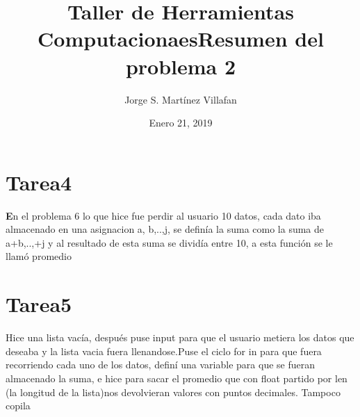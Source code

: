 \documentclass[letterpaper, 12pt, oneside]{article}%
\title{\Huge Taller de Herramientas Computacionaes}
\author{Jorge S. Martínez Villafan}
\date{Enero 21, 2019}
\begin{document}
\maketitle
\newpage
\title{Resumen del problema 2}
\section{Tarea4}
\textbf En el problema 6 lo que hice fue perdir al usuario 10 datos, cada dato iba almacenado en una asignacion a, b,..,j, se definía la suma como la suma de a+b,..,+j y al resultado de esta suma se dividía entre 10, a esta función se le llamó promedio 
\section{Tarea5}
Hice una lista vacía, después puse input para que el usuario metiera los datos que deseaba y la lista vacia fuera llenandose.Puse el ciclo for in para que fuera recorriendo cada uno de los datos, definí una variable para que se fueran almacenado la suma, e hice para sacar el promedio que con float partido por len (la longitud de la lista)nos devolvieran valores con puntos decimales. Tampoco copila
\end{document}
